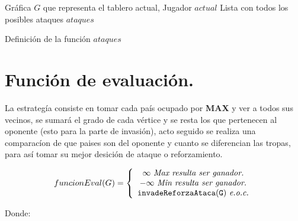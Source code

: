 \documentclass[12pt]{article}
\begin{document}
\begin{algorithm}
\begin{algorithmic}[1]
\REQUIRE Gr\'afica $G$ que representa el tablero actual, Jugador $actual$
\ENSURE Lista con todos los posibles ataques
\ENDFOR
{}
\ELSE
{}
\ENDIF
\ENDIF
\ENDIF
{}
\ENDIF
\ENDFOR
\ENDWHILE
\RETURN $ataques$
\end{algorithmic}
\caption{Definici\'on de la funci\'on $ataques$}
\label{ataques}
\end{algorithm}

\section{Funci\'on de evaluaci\'on.}

La estrateg\'ia consiste en tomar cada pa\'is ocupado por \textbf{MAX} y ver a todos sus vecinos,
se sumar\'a el grado de cada v\'ertice y se resta los que pertenecen al oponente (esto para la parte de invasi\'on), acto seguido
se realiza una comparac\'ion de que paises son del oponente y cuanto se diferencian las tropas, para así tomar su
mejor desici\'on de ataque o reforzamiento.

$$ 
funcionEval(G)= \left\{\begin{array}{c l}
  \infty\ \textit{Max\ resulta\ ser\ ganador.}\\
  -\infty\ \textit{Min\ resulta\ ser\ ganador.}\\
  \mathtt{invadeReforzaAtaca(G)}\ \textit{e.o.c.}
\end{array}
\right.
$$

Donde:\\
\end{document}
